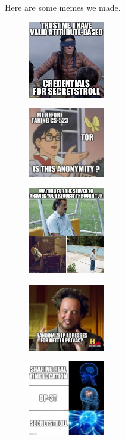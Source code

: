 \documentclass[10pt,conference,compsocconf]{IEEEtran}
\begin{document}
Here are some memes we made.
\begin{figure}[h]
  \includegraphics[width=0.3\textwidth]{meme/pets_meme_1.jpg}
\end{figure}
\begin{figure}[h]
  \includegraphics[width=0.3\textwidth]{meme/pets_meme_2.jpg}
\end{figure}
\begin{figure}[h]
  \includegraphics[width=0.3\textwidth]{meme/pets_meme_3.jpg}
\end{figure}
\begin{figure}[h]
  \includegraphics[width=0.3\textwidth]{meme/pets_meme_4.jpg}
\end{figure}
\begin{figure}[h]
  \includegraphics[width=0.3\textwidth]{meme/pets_meme_5.jpg}
\end{figure}
\end{document}
